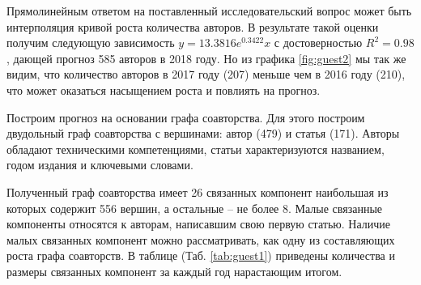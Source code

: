 Прямолинейным ответом на поставленный исследовательский вопрос может быть интерполяция кривой роста количества авторов.
В результате такой оценки получим  следующую зависимость  $y=13.3816e^0.3422x$ с достоверностью $R^2=0.98$, дающей прогноз 585 авторов в 2018 году. 
Но из графика  \ref{fig:guest2} мы так же видим, что количество авторов в 2017 году (207) меньше чем в 2016 году (210), что может оказаться насыщением роста и повлиять на прогноз.

Построим прогноз на основании графа соавторства. 
Для этого построим двудольный граф соавторства с вершинами: автор (479) и статья (171). 
Авторы обладают техническими компетенциями, статьи характеризуются названием, годом издания и ключевыми словами.

Полученный граф соавторства имеет 26 связанных компонент наибольшая из которых содержит 556 вершин, а остальные – не более 8. 
Малые связанные компоненты относятся к авторам, написавшим свою первую статью. Наличие малых связанных компонент можно рассматривать, как одну из составляющих роста графа соавторств. 
В таблице (Таб. \ref{tab:guest1}) приведены количества и размеры связанных компонент за каждый год нарастающим итогом. 

\begin{table}[H]
\centering
\caption{Размеры связанных компонент графа соавторств по годам нарастающим итогом.}
\label{tab:guest1}
\end{table}

